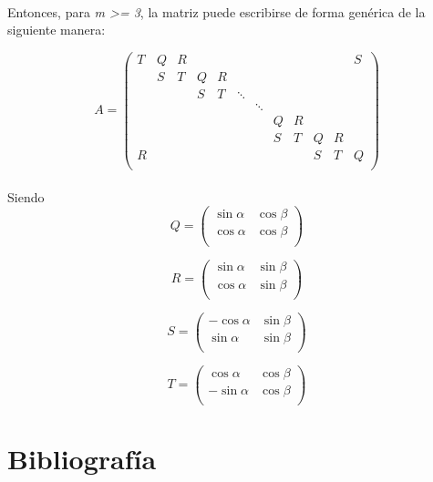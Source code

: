 \documentclass[a4paper,11pt]{article}
\begin{document}
\paragraph{}
Entonces, para \emph{m \textgreater = 3}, la matriz puede escribirse de forma
gen\'erica de la siguiente manera:

\begin{equation} \label{matrizM4}
A =
\left( \begin{array}{cccccccccccc}
T & Q & R &   &   &  &  &  &  &  &  & S\\
  & S & T & Q & R &  &  &  &  &  &  &  \\
  &   &   & S & T & \ddots&  &  &  &  &  &  \\
  &   &   &   &   &  & \ddots&  &  &  &  &  \\
  &   &   &   &   &  &  & Q & R &  &  &  \\
  &   &   &   &   &  &  & S & T & Q & R &  \\
R &   &   &   &   &  &  &   &   & S & T & Q\\
\end{array} \right)
\end{equation}
\paragraph{}
Siendo
\begin{equation} \label{matrizQ}
Q =
\left( \begin{array}{cccc}
\sin \alpha & \cos \beta\\
\cos \alpha & \cos \beta\\
\end{array} \right)
\end{equation}

\begin{equation} \label{matrizR}
R =
\left( \begin{array}{cccc}
\sin \alpha & \sin \beta\\
\cos \alpha & \sin \beta\\
\end{array} \right)
\end{equation}

\begin{equation} \label{matrizS}
S =
\left( \begin{array}{cccc}
-\cos \alpha & \sin \beta\\
\sin \alpha & \sin \beta\\
\end{array} \right)
\end{equation}

\begin{equation} \label{matrizT}
T =
\left( \begin{array}{cccc}
\cos \alpha & \cos \beta\\
-\sin \alpha & \cos \beta\\
\end{array} \right)
\end{equation}

\newpage
\section{Bibliograf\'ia}
\end{document}
